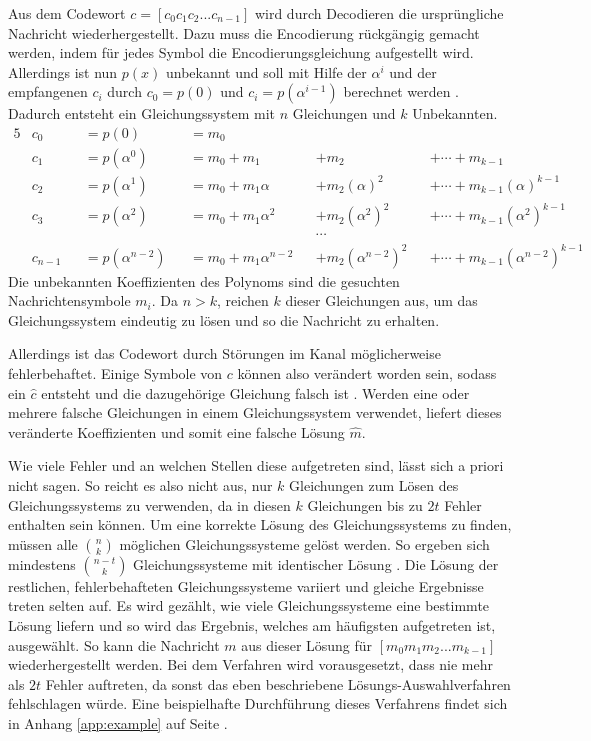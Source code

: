 Aus dem Codewort $c=[c_{0}c_{1}c_{2}...c_{n-1}]$ wird durch Decodieren die ursprüngliche Nachricht wiederhergestellt.
Dazu muss die Encodierung rückgängig gemacht werden, indem für jedes Symbol die Encodierungsgleichung aufgestellt wird. 
Allerdings ist nun $p(x)$ unbekannt und soll mit Hilfe der $\alpha^i$ und der empfangenen $c_i$ durch $c_0=p(0)$ und $c_i=p(\alpha^{i-1})$ berechnet werden \cite{reedPolynomialCodesCertain1960}.
Dadurch entsteht ein Gleichungssystem mit $n$ Gleichungen und $k$ Unbekannten.
\begin{alignat}{5}
	&c_0&&=p(0)&&=m_0\nonumber\\
	&c_1&&=p(\alpha^0)&&=m_0+m_1&&+m_2&&+\cdots+m_{k-1}\nonumber\\
	&c_2&&=p(\alpha^1)&&=m_0+m_1 \alpha&&+m_2 (\alpha)^2&&+\cdots+m_{k-1} (\alpha)^{k-1}\nonumber\\
	&c_3&&=p(\alpha^2)&&=m_0+m_1 \alpha^2&&+m_2 (\alpha^2)^2&&+\cdots+m_{k-1} (\alpha^2)^{k-1}\nonumber\\
	&&&&&&&\cdots\nonumber\\
	&c_{n-1}&&=p(\alpha^{n-2})&&=m_0+m_1 \alpha^{n-2}&&+m_2 (\alpha^{n-2})^2&&+\cdots+m_{k-1} (\alpha^{n-2})^{k-1}\nonumber
\end{alignat}
Die unbekannten Koeffizienten des Polynoms sind die gesuchten Nachrichtensymbole $m_i$. 
Da $n>k$, reichen $k$ dieser Gleichungen aus, um das Gleichungssystem eindeutig zu lösen und so die Nachricht zu erhalten.

Allerdings ist das Codewort durch Störungen im Kanal möglicherweise fehlerbehaftet. 
Einige Symbole von $c$ können also verändert worden sein, sodass ein $\hat{c}$ entsteht und die dazugehörige Gleichung falsch ist \cite{verbeureReedSolomonErrorCorrecting2022}.
Werden eine oder mehrere falsche Gleichungen in einem Gleichungssystem verwendet, liefert dieses veränderte Koeffizienten und somit eine falsche Lösung $\hat{m}$.

Wie viele Fehler und an welchen Stellen diese aufgetreten sind, lässt sich a priori nicht sagen. 
So reicht es also nicht aus, nur $k$ Gleichungen zum Lösen des Gleichungssystems zu verwenden, da in diesen $k$ Gleichungen bis zu $2t$ Fehler enthalten sein können.
Um eine korrekte Lösung des Gleichungssystems zu finden, müssen alle $\binom{n}{k}$ möglichen Gleichungssysteme gelöst werden.
So ergeben sich mindestens $\binom{n-t}{k}$ Gleichungssysteme mit identischer Lösung \cite{reedPolynomialCodesCertain1960}.
Die Lösung der restlichen, fehlerbehafteten Gleichungssysteme variiert und gleiche Ergebnisse treten selten auf.
Es wird gezählt, wie viele Gleichungssysteme eine bestimmte Lösung liefern und so wird das Ergebnis, welches am häufigsten aufgetreten ist, ausgewählt. 
So kann die Nachricht $m$ aus dieser Lösung für $[m_{0}m_{1}m_{2}...m_{k-1}]$ wiederhergestellt werden.
Bei dem Verfahren wird vorausgesetzt, dass nie mehr als $2t$ Fehler auftreten, da sonst das eben beschriebene Lösungs-Auswahlverfahren fehlschlagen würde.
Eine beispielhafte Durchführung dieses Verfahrens findet sich in Anhang \ref{app:example} auf Seite \pageref{app:example}.

